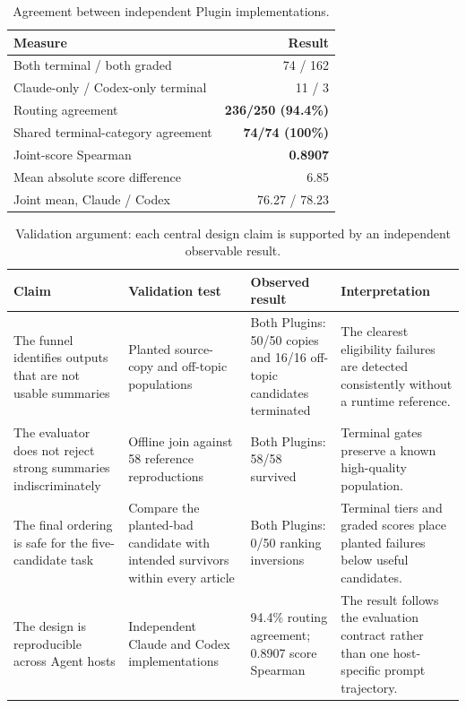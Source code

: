 \documentclass[conference]{IEEEtran}
\begin{document}
\begin{table}[t]
\caption{Agreement between independent Plugin implementations.}
\label{tab:cross}
\centering
\footnotesize
\begin{tabularx}{\columnwidth}{@{}YR@{}}
\toprule
\textbf{Measure} & \textbf{Result} \\
\midrule
Both terminal / both graded & 74 / 162 \\
Claude-only / Codex-only terminal & 11 / 3 \\
Routing agreement & \textbf{236/250 (94.4\%)} \\
Shared terminal-category agreement & \textbf{74/74 (100\%)} \\
Joint-score Spearman & \textbf{0.8907} \\
Mean absolute score difference & 6.85 \\
Joint mean, Claude / Codex & 76.27 / 78.23 \\
\bottomrule
\end{tabularx}
\end{table}

\begin{table}[t]
\caption{Validation argument: each central design claim is supported by an independent observable result.}
\label{tab:argument}
\centering
\footnotesize
\begin{tabularx}{0.96\textwidth}{@{}P{30mm}@{\hspace{3mm}}P{38mm}@{\hspace{3mm}}P{34mm}@{\hspace{3mm}}Y@{}}
\toprule
\textbf{Claim} & \textbf{Validation test} & \textbf{Observed result} & \textbf{Interpretation} \\
\midrule
The funnel identifies outputs that are not usable summaries & Planted source-copy and off-topic populations & Both Plugins: 50/50 copies and 16/16 off-topic candidates terminated & The clearest eligibility failures are detected consistently without a runtime reference. \\
The evaluator does not reject strong summaries indiscriminately & Offline join against 58 reference reproductions & Both Plugins: 58/58 survived & Terminal gates preserve a known high-quality population. \\
The final ordering is safe for the five-candidate task & Compare the planted-bad candidate with intended survivors within every article & Both Plugins: 0/50 ranking inversions & Terminal tiers and graded scores place planted failures below useful candidates. \\
The design is reproducible across Agent hosts & Independent Claude and Codex implementations & 94.4\% routing agreement; 0.8907 score Spearman & The result follows the evaluation contract rather than one host-specific prompt trajectory. \\
\bottomrule
\end{tabularx}
\end{table}
\end{document}
